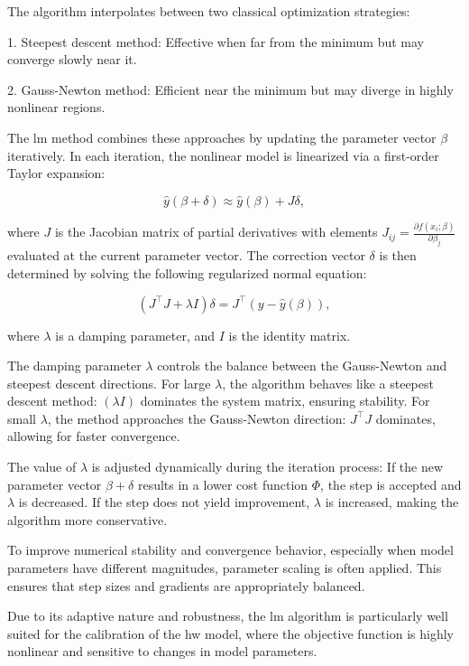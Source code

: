 The algorithm interpolates between two classical optimization strategies:

1. Steepest descent method: Effective when far from the minimum but may converge slowly near it.

2. Gauss-Newton method: Efficient near the minimum but may diverge in highly nonlinear regions.

The \ac{lm} method combines these approaches by updating the parameter vector $\beta$ iteratively. In each iteration, the nonlinear model is linearized via a first-order Taylor expansion:

\begin{equation}
	\hat{y}(\beta + \delta) \approx \hat{y}(\beta) + J \delta,
\end{equation}

where $J$ is the Jacobian matrix of partial derivatives with elements $J_{ij} = \frac{\partial f(x_i; \beta)}{\partial \beta_j}$ evaluated at the current parameter vector. The correction vector $\delta$ is then determined by solving the following regularized normal equation:

\begin{equation}
	(J^\top J + \lambda I)\delta = J^\top (y - \hat{y}(\beta)),
\end{equation}

where $\lambda$ is a damping parameter, and $I$ is the identity matrix.

The damping parameter $\lambda$ controls the balance between the Gauss-Newton and steepest descent directions. For large $\lambda$, the algorithm behaves like a steepest descent method: $(\lambda I)$ dominates the system matrix, ensuring stability. For small $\lambda$, the method approaches the Gauss-Newton direction: $J^\top J$ dominates, allowing for faster convergence.

The value of $\lambda$ is adjusted dynamically during the iteration process:
If the new parameter vector $\beta + \delta$ results in a lower cost function $\Phi$, the step is accepted and $\lambda$ is decreased. If the step does not yield improvement, $\lambda$ is increased, making the algorithm more conservative.

To improve numerical stability and convergence behavior, especially when model parameters have different magnitudes, parameter scaling is often applied. This ensures that step sizes and gradients are appropriately balanced.

Due to its adaptive nature and robustness, the \ac{lm} algorithm is particularly well suited for the calibration of the \ac{hw} model, where the objective function is highly nonlinear and sensitive to changes in model parameters.

